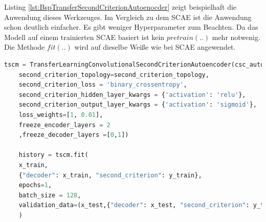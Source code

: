 	Listing \ref{lst:BspTransferSecondCriterionAutoenocder} zeigt beispielhaft die Anwendung dieses Werkzeuges. Im Vergleich zu dem SCAE ist die Anwendung schon deutlich einfacher. Es gibt weniger Hyperparameter zum Beachten. Da das Modell auf einem trainierten SCAE basiert ist kein $pretrain(..)$ mehr notwenig. Die Methode $fit(..)$ wird auf dieselbe Weiße wie bei SCAE angewendet.	


	\begin{lstlisting}[language=python,caption=Beispiel TransferSecondCriterionAutoenocder in Python, label=lst:BspTransferSecondCriterionAutoenocder]
	tscm = TransferLearningConvolutionalSecondCriterionAutoencoder(csc_autoencoder,
	second_criterion_topology=second_criterion_topology,
	second_criterion_loss = 'binary_crossentropy',                                                                                                   
	second_criterion_hidden_layer_kwargs = {'activation': 'relu'},
	second_criterion_output_layer_kwargs = {'activation': 'sigmoid'}, 
	loss_weights=[1, 0.01],
	freeze_encoder_layers = 2
	,freeze_decoder_layers =[0,1])
	
	history = tscm.fit(
	x_train,
	{"decoder": x_train, "second_criterion": y_train}, 
	epochs=1,
	batch_size = 128,
	validation_data=(x_test,{"decoder": x_test, "second_criterion": y_test}))
	)
	\end{lstlisting}
			
